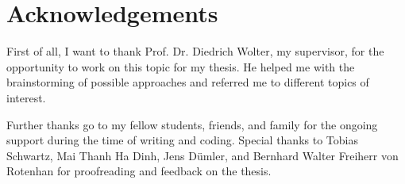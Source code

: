 %
\section{Acknowledgements}\label{sec:acknowledgements}
%
First of all, I want to thank Prof. Dr. Diedrich Wolter, my supervisor, for the opportunity to work on this topic for my thesis. He helped me with the brainstorming of possible approaches and referred me to different topics of interest.

Further thanks go to my fellow students, friends, and family for the ongoing support during the time of writing and coding. Special thanks to Tobias Schwartz, Mai Thanh Ha Dinh, Jens Dümler, and Bernhard Walter Freiherr von Rotenhan for proofreading and feedback on the thesis.
